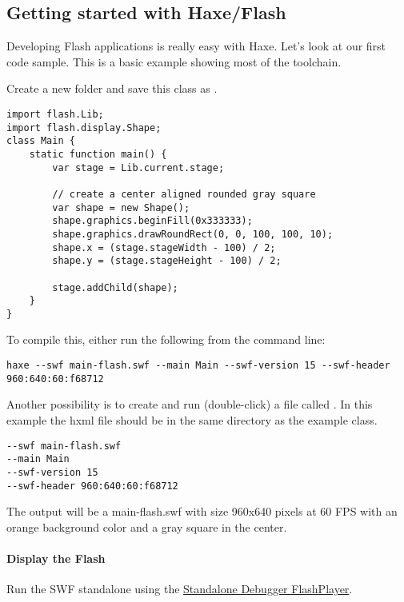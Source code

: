\subsection{Getting started with Haxe/Flash}
\label{target-flash-getting-started}

Developing Flash applications is really easy with Haxe. Let's look at our first code sample.
This is a basic example showing most of the toolchain. 

Create a new folder and save this class as .

\begin{lstlisting}
import flash.Lib;
import flash.display.Shape;
class Main {
    static function main() {
        var stage = Lib.current.stage;
        
        // create a center aligned rounded gray square
        var shape = new Shape();
        shape.graphics.beginFill(0x333333);
		shape.graphics.drawRoundRect(0, 0, 100, 100, 10);
		shape.x = (stage.stageWidth - 100) / 2;
		shape.y = (stage.stageHeight - 100) / 2;
		
		stage.addChild(shape);
    }    
}
\end{lstlisting}

To compile this, either run the following from the command line:

\begin{lstlisting}
haxe --swf main-flash.swf --main Main --swf-version 15 --swf-header 960:640:60:f68712
\end{lstlisting}

Another possibility is to create and run (double-click) a file called . In this example the hxml file should be in the same directory as the example class.

\begin{lstlisting}
--swf main-flash.swf
--main Main
--swf-version 15
--swf-header 960:640:60:f68712
\end{lstlisting}

The output will be a main-flash.swf with size 960x640 pixels at 60 FPS with an orange background color and a gray square in the center.

\paragraph{Display the Flash}

Run the SWF standalone using the \href{https://www.adobe.com/support/flashplayer/downloads.html}{Standalone Debugger FlashPlayer}. 

